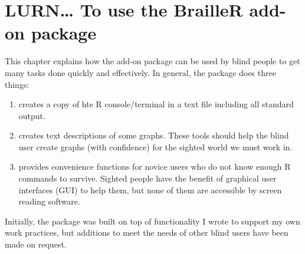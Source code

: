 

\chapter{LURN\ldots{} To use the BrailleR add-on package} 
\label{BrailleR} 
 

 
This chapter explains how the  add-on package can be used by blind people to get many tasks done quickly and effectively. In general, the package does three things:\begin{enumerate} 
\item creates a copy of hte R console/terminal in a text file including all standard output. 
\item creates text descriptions of some graphs. These tools should help the blind user create graphs (with confidence) for the sighted world we must work in. 
\item provides convenience functions for novice users who do not know enough R commands to survive. Sighted people have the benefit of graphical user interfaces (GUI) to help them, but none of them are accessible by screen reading software. 
\end{enumerate} 
Initially, the package was built on top of functionality I wrote to support my own work practices, but additions to meet the needs of other blind \R{} users have been made on request.  
 
